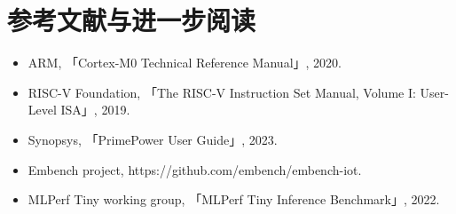 \section{参考文献与进一步阅读}
\begin{itemize}
\item ARM, 「Cortex-M0 Technical Reference Manual」, 2020.
\item RISC-V Foundation, 「The RISC-V Instruction Set Manual, Volume I: User-Level ISA」, 2019.
\item Synopsys, 「PrimePower User Guide」, 2023.
\item Embench project, https://github.com/embench/embench-iot.
\item MLPerf Tiny working group, 「MLPerf Tiny Inference Benchmark」, 2022.
\end{itemize}

